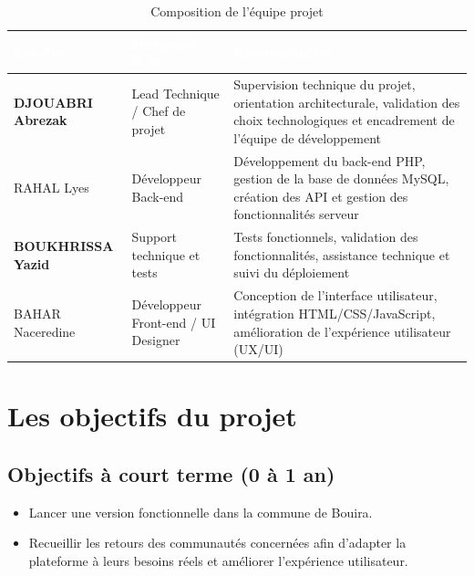 \documentclass[12pt,a4paper]{report}
\newcommand{\thdcell}[1]{%
  \cellcolor{tabhead}\textbf{\textcolor{white}{#1}}%
}
\begin{document}
\begin{table}[H]
  \centering
  \caption{Composition de l'équipe projet}
  \renewcommand{\arraystretch}{1.4}
  \begin{tabularx}{\linewidth}{>{\bfseries}lXX}
    \toprule
    \rowcolor{primary}
    \thdcell{Membre} & \thdcell{Formation / Rôle} & \thdcell{Responsabilités} \\
    \midrule

    DJOUABRI Abrezak & Lead Technique / Chef de projet &
    Supervision technique du projet, orientation architecturale, validation des
    choix technologiques et encadrement de l'équipe de développement \\

    \rowcolor{lightgray}

    RAHAL Lyes & Développeur Back-end &
    Développement du back-end PHP, gestion de la base de données MySQL,
    création des API et gestion des fonctionnalités serveur \\

    BOUKHRISSA Yazid & Support technique et tests &
    Tests fonctionnels, validation des fonctionnalités, assistance technique
    et suivi du déploiement \\

    \rowcolor{lightgray}

    BAHAR Naceredine & Développeur Front-end / UI Designer &
    Conception de l'interface utilisateur, intégration HTML/CSS/JavaScript,
    amélioration de l'expérience utilisateur (UX/UI) \\

    \bottomrule
  \end{tabularx}
\end{table}

\section{Les objectifs du projet}

\subsection{Objectifs à court terme (0 à 1 an)}
\begin{itemize}
  \item Lancer une version fonctionnelle dans la commune de Bouira.
  \item Recueillir les retours des communautés concernées afin d'adapter la
        plateforme à leurs besoins réels et améliorer l'expérience utilisateur.
\end{itemize}
\end{document}
